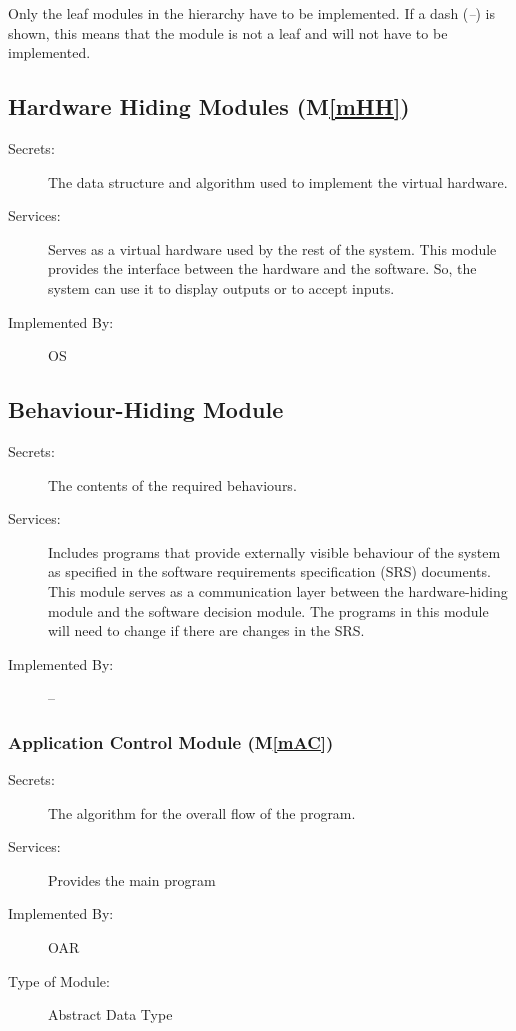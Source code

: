 \documentclass[12pt, titlepage]{article}
\newcommand{\mref}[1]{M\ref{#1}}
\begin{document}
Only the leaf modules in the hierarchy have to be implemented. If a dash
(\emph{--}) is shown, this means that the module is not a leaf and will not have
to be implemented.

\subsection{Hardware Hiding Modules (\mref{mHH})}

\begin{description}
\item[Secrets:]The data structure and algorithm used to implement the virtual
  hardware.
\item[Services:]Serves as a virtual hardware used by the rest of the
  system. This module provides the interface between the hardware and the
  software. So, the system can use it to display outputs or to accept inputs.
\item[Implemented By:] OS
\end{description}

\subsection{Behaviour-Hiding Module}

\begin{description}
\item[Secrets:]The contents of the required behaviours.
\item[Services:]Includes programs that provide externally visible behaviour of
  the system as specified in the software requirements specification (SRS)
  documents. This module serves as a communication layer between the
  hardware-hiding module and the software decision module. The programs in this
  module will need to change if there are changes in the SRS.
\item[Implemented By:] --
\end{description}

\subsubsection{Application Control Module (\mref{mAC})}

\begin{description}
\item[Secrets:] The algorithm for the overall flow of the program.
\item[Services:] Provides the main program
\item[Implemented By:] OAR
\item[Type of Module:] Abstract Data Type
\end{description}
\end{document}

